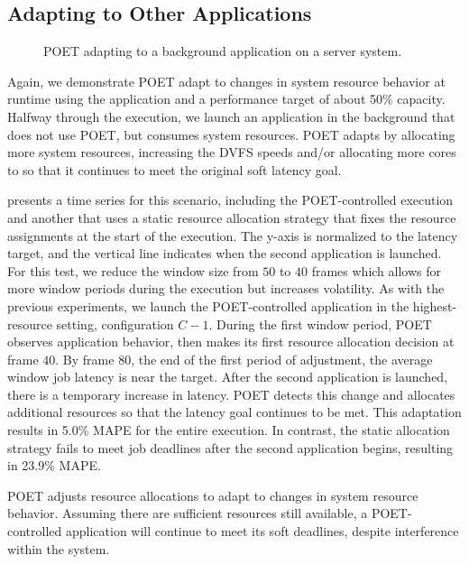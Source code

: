 \subsection{Adapting to Other Applications}

\begin{figure}[t]
  \centering
      
  \caption{POET adapting to a background application on a server system.}
  \label{fig:poet-server-multiapp}
\end{figure}

Again, we demonstrate POET adapt to changes in system resource behavior at runtime using the  application and a performance target of about 50\% capacity.
Halfway through the execution, we launch an application in the background that does not use POET, but consumes system resources.
POET adapts by allocating more system resources, \ie increasing the DVFS speeds and/or allocating more cores to  so that it continues to meet the original soft latency goal.

 presents a time series for this scenario, including the POET-controlled execution and another that uses a static resource allocation strategy that fixes the resource assignments at the start of the execution.
The y-axis is normalized to the latency target, and the vertical line indicates when the second application is launched.
For this test, we reduce the window size from $50$ to $40$ frames which allows for more window periods during the execution but increases volatility.
As with the previous experiments, we launch the POET-controlled  application in the highest-resource setting, configuration $C-1$.
During the first window period, POET observes application behavior, then makes its first resource allocation decision at frame $40$.
By frame $80$, the end of the first period of adjustment, the average window job latency is near the target.
After the second application is launched, there is a temporary increase in latency.
POET detects this change and allocates additional resources so that the latency goal continues to be met.
This adaptation results in 5.0\% MAPE for the entire execution.
In contrast, the static allocation strategy fails to meet job deadlines after the second application begins, resulting in 23.9\% MAPE.

POET adjusts resource allocations to adapt to changes in system resource behavior.
Assuming there are sufficient resources still available, a POET-controlled application will continue to meet its soft deadlines, despite interference within the system.


